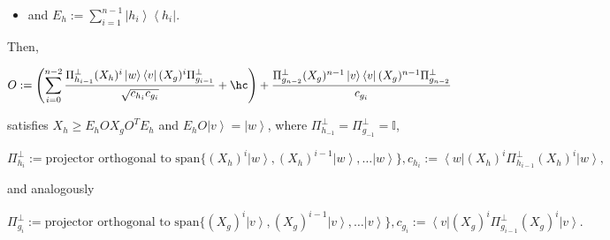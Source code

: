 \documentclass{article}
\begin{document}
\begin{proposition}
\begin{itemize}
    \item and $E_{h}:=\sum_{i=1}^{n-1}\left|h_{i}\right\rangle \left\langle h_{i}\right|$.
  \end{itemize}
  Then,
  \begin{small}
    \begin{displaymath}
      O:=\left(\sum_{i=0}^{n-2}\frac{\Pi_{h_{i-1}}^{\perp}(X_{h})^{i}\left|w\right\rangle \left\langle v\right|(X_{g})^{i}\Pi_{g_{i-1}}^{\perp}}{\sqrt{c_{h_{i}}c_{g_{i}}}}+\hc\right)+\frac{\Pi_{g_{n-2}}^{\perp}(X_{g})^{n-1}\left|v\right\rangle \left\langle v\right|(X_{g})^{n-1}\Pi_{g_{n-2}}^{\perp}}{c_{g_{i}}}
    \end{displaymath}
  \end{small}	satisfies $X_{h}\ge E_{h}OX_{g}O^{T}E_{h}$ and $E_{h}O\left|v\right\rangle =\left|w\right\rangle$,
  where $\Pi_{h_{-1}}^{\perp}=\Pi_{g_{-1}}^{\perp}=\mathbb{I}$,
  \begin{small}
    \begin{displaymath}
      \Pi_{h_{i}}^{\perp}:=\text{projector orthogonal to }\text{span}\{(X_{h})^{i}\left|w\right\rangle ,(X_{h})^{i-1}\left|w\right\rangle ,\dots\left|w\right\rangle \},
      c_{h_{i}}:=\left\langle w\right|(X_{h})^{i}\Pi_{h_{i-1}}^{\perp}(X_{h})^{i}\left|w\right\rangle,\end{displaymath}
  \end{small} and analogously
  \begin{small}
    \begin{displaymath}
      \Pi_{g_{i}}^{\perp}:=\text{projector orthogonal to }\text{span}\{(X_{g})^{i}\left|v\right\rangle ,(X_{g})^{i-1}\left|v\right\rangle ,\dots\left|v\right\rangle \},
      c_{g_{i}}:=\left\langle v\right|(X_{g})^{i}\Pi_{g_{i-1}}^{\perp}(X_{g})^{i}\left|v\right\rangle .\end{displaymath}
  \end{small}

\end{proposition}
\end{document}
